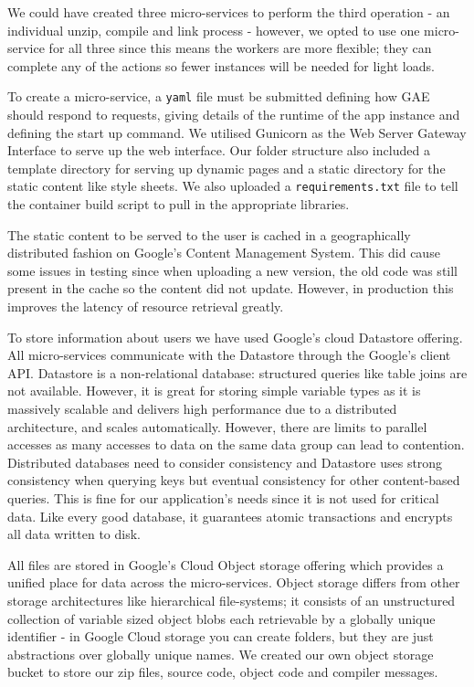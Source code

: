 \documentclass[conference]{IEEEtran}
\begin{document}
We could have created three micro-services to perform the third operation - an
individual unzip, compile and link process - however, we opted to use one
micro-service for all three since this means the workers are more flexible; they can complete any
of the actions so fewer instances will be needed for light loads.

To create a micro-service, a \texttt{yaml} file must be submitted defining
how GAE should respond to requests, giving details of the runtime of the
app instance and defining the start up command. We utilised
Gunicorn\cite{gunicorn} as the Web Server Gateway Interface to serve up
the web interface. Our folder structure also included a template directory for
serving up dynamic pages and a static directory for the static content like
style sheets. We also uploaded a \texttt{requirements.txt} file to tell the
container build script to pull in the appropriate libraries.

The static content to be served to the user is cached in a geographically
distributed fashion on Google's Content Management System. This did cause some
issues in testing since when uploading a new version, the old code was still
present in the cache so the content did not update. However, in production this
improves the latency of resource retrieval greatly.

To store information about users we have used Google's cloud
Datastore\cite{datastore} offering. All micro-services communicate with the
Datastore through the Google's client API. Datastore is a non-relational
database: structured queries like table joins are not available. However,
it is great for storing simple variable types as it is
massively scalable and delivers high performance due to a distributed
architecture, and scales automatically. However, there are limits to parallel
accesses as many accesses to data on the same data group can lead to contention.
Distributed databases need to consider consistency and Datastore uses
strong consistency when querying keys but eventual consistency for other
content-based queries. This is fine for our application's needs since it is not used for critical data. Like every good database, it guarantees atomic transactions and
encrypts all data written to disk.

All files are stored in Google's Cloud Object storage offering\cite{storage}
which provides a unified place for data across the micro-services. Object
storage differs from other storage architectures like hierarchical file-systems;
it consists of an unstructured collection of variable sized object blobs each
retrievable by a globally unique identifier - in Google Cloud storage you can
create folders, but they are just abstractions over globally unique names.
We created our own object storage bucket to store our zip files, source code, 
object code and compiler messages.
\end{document}
